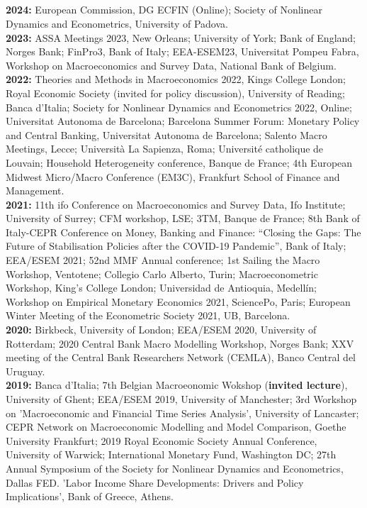 \documentclass[margin, 11pt]{res} %
\begin{document}
\begin{resume}
\section{}
\textbf{2024:} {European Commission, DG ECFIN (Online); Society of Nonlinear Dynamics and Econometrics, University of Padova.}
\\
\textbf{2023:} {ASSA Meetings 2023, New Orleans; University of York; Bank of England; Norges Bank; FinPro3, Bank of Italy; EEA-ESEM23, Universitat Pompeu Fabra, Workshop on Macroeconomics and Survey Data, National Bank of Belgium.}
\\
\textbf{2022:} {Theories and Methods in Macroeconomics 2022, Kings College London; Royal Economic Society (invited for policy discussion), University of Reading; Banca d'Italia; Society for Nonlinear Dynamics and Econometrics 2022, Online; Universitat Autonoma de Barcelona; Barcelona Summer Forum: Monetary Policy and Central Banking, Universitat Autonoma de Barcelona; Salento Macro Meetings, Lecce; Universit\`{a} La Sapienza, Roma; Universit\'{e} catholique de Louvain; Household Heterogeneity conference, Banque de France; 4th European Midwest Micro/Macro Conference (EM3C), Frankfurt School of Finance and Management.}
\\
\textbf{2021:} {11th ifo Conference on Macroeconomics and Survey Data, Ifo Institute; University of Surrey; CFM workshop, LSE; 3TM, Banque de France; 8th Bank of Italy-CEPR Conference on Money, Banking and Finance: “Closing the Gaps: The Future of Stabilisation Policies after the COVID-19 Pandemic”, Bank of Italy; EEA/ESEM 2021; 52nd MMF Annual conference; 1st Sailing the Macro Workshop, Ventotene; Collegio Carlo Alberto, Turin; Macroeconometric Workshop, King's College London; Universidad de Antioquia, Medell\'{i}n; Workshop on Empirical Monetary Economics 2021, SciencePo, Paris; European Winter Meeting of the Econometric Society 2021, UB, Barcelona.}
\\
\textbf{2020:} {Birkbeck, University of London; EEA/ESEM 2020, University of Rotterdam; 2020 Central Bank Macro Modelling Workshop, Norges Bank; XXV meeting of the Central Bank Researchers Network (CEMLA), Banco Central del Uruguay.}
\\
\textbf{2019:} {Banca d'Italia; 7th Belgian Macroeonomic Wokshop (\textbf{invited lecture}), University of Ghent; EEA/ESEM 2019, University of Manchester; 3rd Workshop on 'Macroeconomic and Financial Time Series Analysis', University of Lancaster; CEPR Network on Macroeconomic Modelling and Model Comparison, Goethe University Frankfurt; 2019 Royal Economic Society Annual Conference, University of Warwick; International Monetary Fund, Washington DC; 27th Annual Symposium of the Society for Nonlinear Dynamics and Econometrics, Dallas FED. 'Labor Income Share Developments: Drivers and Policy Implications', Bank of Greece, Athens.}

\end{resume}
\end{document}
